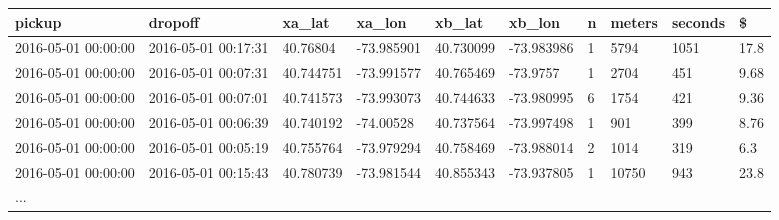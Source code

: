 \begin{tabular}{llllllllll}
\toprule
             pickup &             dropoff &     xa\_lat &     xa\_lon &     xb\_lat &     xb\_lon & n & meters & seconds &     \$ \\
\midrule
2016-05-01 00:00:00 & 2016-05-01 00:17:31 &   40.76804 & -73.985901 &  40.730099 & -73.983986 & 1 &   5794 &    1051 &  17.8 \\
2016-05-01 00:00:00 & 2016-05-01 00:07:31 &  40.744751 & -73.991577 &  40.765469 &   -73.9757 & 1 &   2704 &     451 &  9.68 \\
2016-05-01 00:00:00 & 2016-05-01 00:07:01 &  40.741573 & -73.993073 &  40.744633 & -73.980995 & 6 &   1754 &     421 &  9.36 \\
2016-05-01 00:00:00 & 2016-05-01 00:06:39 &  40.740192 &  -74.00528 &  40.737564 & -73.997498 & 1 &    901 &     399 &  8.76 \\
2016-05-01 00:00:00 & 2016-05-01 00:05:19 &  40.755764 & -73.979294 &  40.758469 & -73.988014 & 2 &   1014 &     319 &   6.3 \\
2016-05-01 00:00:00 & 2016-05-01 00:15:43 &  40.780739 & -73.981544 &  40.855343 & -73.937805 & 1 &  10750 &     943 &  23.8 \\
                ... &                     &            &            &            &            &   &        &         &       \\
\bottomrule
\end{tabular}

